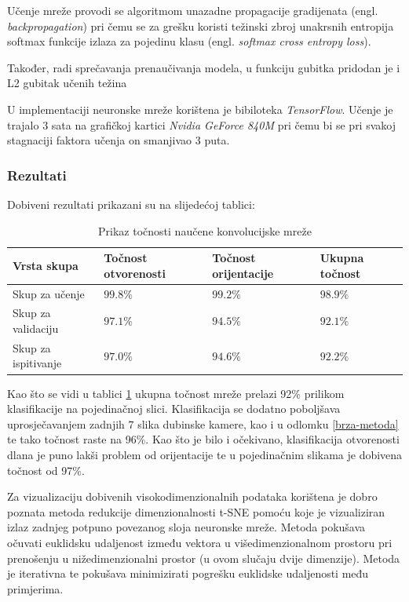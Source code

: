 \documentclass[times, utf8, diplomski, numeric]{fer}
\begin{document}
Učenje mreže provodi se algoritmom unazadne propagacije gradijenata (engl. \textit{backpropagation}) pri čemu se za grešku koristi težinski zbroj unakrsnih entropija softmax funkcije izlaza za pojedinu klasu (engl. \textit{softmax cross entropy loss}).

Također, radi sprečavanja prenaučivanja modela, u funkciju gubitka pridodan je i L2 gubitak učenih težina

U implementaciji neuronske mreže korištena je bibiloteka \textit{TensorFlow}. Učenje je trajalo 3 sata na grafičkoj kartici \textit{Nvidia GeForce 840M} pri čemu bi se pri svakoj stagnaciji faktora učenja on smanjivao 3 puta.

\subsubsection{Rezultati}
Dobiveni rezultati prikazani su na slijedećoj tablici:
\begin{table}[h!]
    \centering
    \begin{tabular}{ | l  l  l  l |}
    \hline
Vrsta skupa & Točnost otvorenosti & Točnost orijentacije & Ukupna točnost \\ \hline
    Skup za učenje & $99.8\%$&$99.2\%$&$98.9\%$\\
    Skup za validaciju &$97.1\%$&$94.5\%$&$92.1\%$\\
    Skup za ispitivanje & $97.0\%$&$94.6\%$&$92.2\%$\\ \hline
    \end{tabular}
    \caption{Prikaz točnosti naučene konvolucijske mreže} \label{rezultati-mreze}
\end{table}

Kao što se vidi u tablici \ref{rezultati-mreze} ukupna točnost mreže prelazi 92\% prilikom klasifikacije na pojedinačnoj slici. Klasifikacija se dodatno poboljšava uprosječavanjem zadnjih $7$ slika dubinske kamere, kao i u odlomku \ref{brza-metoda} te tako točnost raste na 96\%. Kao što je bilo i očekivano, klasifikacija otvorenosti dlana je puno lakši problem od orijentacije te u pojedinačnim slikama je dobivena točnost od 97\%.

Za vizualizaciju dobivenih visokodimenzionalnih podataka korištena je dobro poznata metoda redukcije dimenzionalnosti t-SNE \cite{van2008visualizing} pomoću koje je vizualiziran izlaz zadnjeg potpuno povezanog sloja neuronske mreže. Metoda pokušava očuvati euklidsku udaljenost između vektora u višedimenzionalnom prostoru pri prenošenju u nižedimenzionalni prostor (u ovom slučaju dvije dimenzije). Metoda je iterativna te pokušava minimizirati pogrešku euklidske udaljenosti među primjerima.
\end{document}
